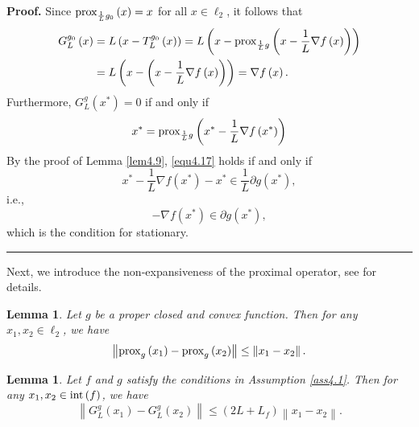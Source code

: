 \documentclass[a4paper,12pt]{article}
\newtheorem{lemma}[theorem]{Lemma}
\numberwithin{equation}{section}
\newenvironment{proof}[1][Proof]{\textbf{#1.} }
{\ \rule{0.75em}{0.75em}\smallskip}
\begin{document}
\begin{proof}
    Since ${\rm prox}_{\frac{1}{L}g_{0}}\left(x\right)=x$ for all $x\in\ell_{2}$, it follows that
    \begin{align*}
        G_{L}^{g_{0}}\left(x\right)
        & = L\left(x-T_{L}^{g_{0}}\left(x\right)\right)=  L\left(x-{\rm prox}_{\frac{1}{L}g}\left(x-\frac{1}{L}\nabla f\left(x\right)\right)\right) \\
        & = L\left(x-\left(x-\frac{1}{L}\nabla f\left(x\right)\right)\right) = \nabla f\left(x\right).
    \end{align*}
     Furthermore, $G_{L}^{g}\left(x^{*}\right)=0$ if and only if 
    \begin{equation}\label{equ4.17}
        x^{*}={\rm prox}_{\frac{1}{L}g}\left(x^{*}-\frac{1}{L}\nabla f\left(x^{*}\right)\right)
    \end{equation}
    By the proof of Lemma \ref{lem4.9}, \eqref{equ4.17} holds if and only if
    \begin{equation*}
        x^{*}-\frac{1}{L}\nabla f\left(x^{*}\right)-x^{*}\in \frac{1}{L}\partial g\left(x^{*}\right),
    \end{equation*}
    i.e.,
    \begin{equation*}
        -\nabla f\left(x^{*}\right)\in \partial g\left(x^{*}\right),
    \end{equation*}
    which is the condition for stationary.
\end{proof}

\par Next, we introduce the non-expansiveness of the proximal operator, see \cite[Theorem 6.42]{B17} for details.

\begin{lemma}\label{lem4.12}
    Let $g$ be a proper closed and convex function. Then for any $x_{1},x_{2}\in \ell_{2}$, we have 
    \begin{equation*}
        \left\|{\rm prox}_{g}\left(x_{1}\right)-{\rm prox}_{g}\left(x_{2}\right)\right\| \leq \left\|x_{1}-x_{2}\right\|.
    \end{equation*}
\end{lemma}

\begin{lemma}\label{lem4.13}
    Let $f$ and $g$ satisfy the conditions in Assumption \ref{ass4.1}. Then for any $x_{1},x_{2}\in {\rm int}\left(f\right)$, we have 
    \begin{equation*}
        \left\|G_{L}^{g}\left(x_{1}\right)-G_{L}^{g}\left(x_{2}\right)\right\| \leq \left(2L+L_{f}\right)\left\|x_{1}-x_{2}\right\|.
    \end{equation*}
\end{lemma}
\end{document}
